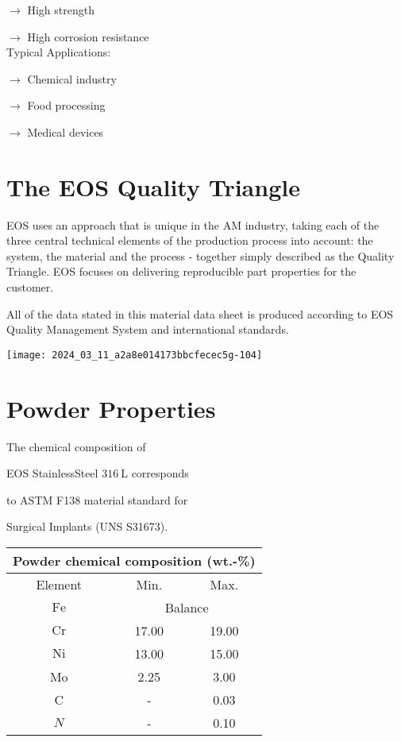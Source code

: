 \documentclass[10pt]{article}
\begin{document}
$\longrightarrow$ High strength

$\longrightarrow$ High corrosion resistance\\
Typical Applications:

$\longrightarrow$ Chemical industry

$\longrightarrow$ Food processing

$\longrightarrow$ Medical devices

\section*{The EOS Quality Triangle}
EOS uses an approach that is unique in the AM industry, taking each of the three central technical elements of the production process into account: the system, the material and the process - together simply described as the Quality Triangle. EOS focuses on delivering reproducible part properties for the customer.

All of the data stated in this material data sheet is produced according to EOS Quality Management System and international standards.

\begin{center}
\texttt{[image: 2024\_03\_11\_a2a8e014173bbcfecec5g-104]}
\end{center}

\section*{Powder Properties}
The chemical composition of

EOS StainlessSteel $316 \mathrm{~L}$ corresponds

to ASTM F138 material standard for

Surgical Implants (UNS S31673).

\begin{center}
\begin{tabular}{|c|c|c|}
\hline
\multicolumn{3}{|c|}{Powder chemical composition (wt.-\%)} \\
\hline
Element & Min. & Max. \\
\hline
$\mathrm{Fe}$ & \multicolumn{2}{|c|}{Balance} \\
\hline
$\mathrm{Cr}$ & 17.00 & 19.00 \\
\hline
$\mathrm{Ni}$ & 13.00 & 15.00 \\
\hline
Mo & 2.25 & 3.00 \\
\hline
C & - & 0.03 \\
\hline
$N$ & - & 0.10 \\
\hline
\end{tabular}
\end{center}
\end{document}
